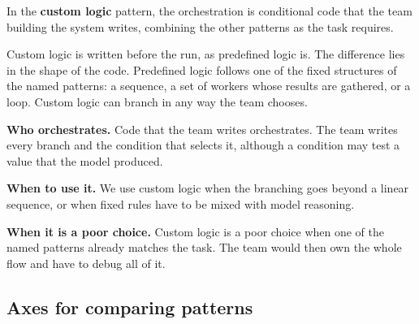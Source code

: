In the \textbf{custom logic} pattern, the orchestration is conditional code that the team building
the system writes, combining the other patterns as the task requires.

Custom logic is written before the run, as predefined logic is. The difference lies in the shape of
the code. Predefined logic follows one of the fixed structures of the named patterns: a sequence, a
set of workers whose results are gathered, or a loop. Custom logic can branch in any way the team
chooses.
\bi
\item \textbf{Who orchestrates.} Code that the team writes orchestrates. The team writes every
branch and the condition that selects it, although a condition may test a value that the model
produced.
\item \textbf{When to use it.} We use custom logic when the branching goes beyond a linear sequence,
or when fixed rules have to be mixed with model reasoning.
\item \textbf{When it is a poor choice.} Custom logic is a poor choice when one of the named patterns
already matches the task. The team would then own the whole flow and have to debug all of it.
\ei

\subsection{Axes for comparing patterns}
\label{sec:patterns-axes}

